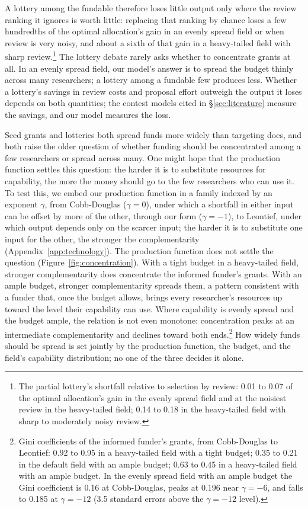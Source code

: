 \documentclass[article, 11pt, reqno]{amsart}
\theoremstyle{named}
\begin{document}


A lottery among the fundable therefore loses little output only where the review ranking it ignores is worth little: replacing that ranking by chance loses a few hundredths of the optimal allocation's gain in an evenly spread field or when review is very noisy, and about a sixth of that gain in a heavy-tailed field with sharp review.\footnote{The partial lottery's shortfall relative to selection by review: 0.01 to 0.07 of the optimal allocation's gain in the evenly spread field and at the noisiest review in the heavy-tailed field; 0.14 to 0.18 in the heavy-tailed field with sharp to moderately noisy review.} The lottery debate rarely asks whether to concentrate grants at all. In an evenly spread field, our model's answer is to spread the budget thinly across many researchers; a lottery among a fundable few produces less. Whether a lottery's savings in review costs and proposal effort outweigh the output it loses depends on both quantities; the contest models cited in \S\ref{sec:literature} measure the savings, and our model measures the loss.

Seed grants and lotteries both spread funds more widely than targeting does, and both raise the older question of whether funding should be concentrated among a few researchers or spread across many. One might hope that the production function settles this question: the harder it is to substitute resources for capability, the more the money should go to the few researchers who can use it. To test this, we embed our production function in a family indexed by an exponent $\gamma$, from Cobb-Douglas ($\gamma = 0$), under which a shortfall in either input can be offset by more of the other, through our form ($\gamma = -1$), to Leontief, under which output depends only on the scarcer input; the harder it is to substitute one input for the other, the stronger the complementarity (Appendix~\ref{app:technology}). The production function does not settle the question (Figure~\ref{fig:concentration}). With a tight budget in a heavy-tailed field, stronger complementarity does concentrate the informed funder's grants. With an ample budget, stronger complementarity spreads them, a pattern consistent with a funder that, once the budget allows, brings every researcher's resources up toward the level their capability can use. Where capability is evenly spread and the budget ample, the relation is not even monotone: concentration peaks at an intermediate complementarity and declines toward both ends.\footnote{Gini coefficients of the informed funder's grants, from Cobb-Douglas to Leontief: 0.92 to 0.95 in a heavy-tailed field with a tight budget; 0.35 to 0.21 in the default field with an ample budget; 0.63 to 0.45 in a heavy-tailed field with an ample budget. In the evenly spread field with an ample budget the Gini coefficient is 0.16 at Cobb-Douglas, peaks at 0.196 near $\gamma = -6$, and falls to 0.185 at $\gamma = -12$ (3.5 standard errors above the $\gamma = -12$ level).} How widely funds should be spread is set jointly by the production function, the budget, and the field's capability distribution; no one of the three decides it alone.
\end{document}
